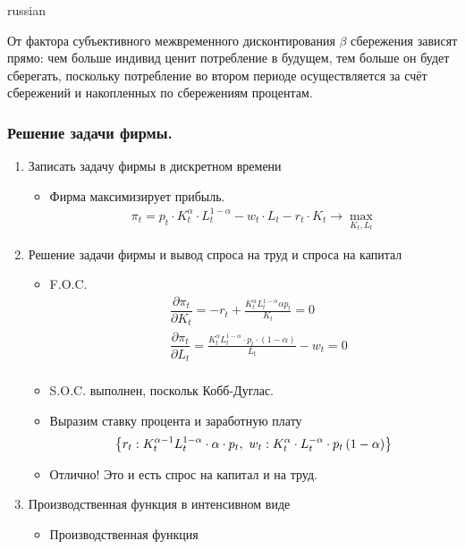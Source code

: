 \documentclass[fleqn]{article}
\begin{document}
\begin{otherlanguage*}{russian}
\begin{enumerate}[label=\alph*), leftmargin=*]
\begin{itemize}
От фактора субъективного межвременного дисконтирования $ \beta$ сбережения зависят прямо: чем больше индивид ценит потребление в будущем, тем больше он будет сберегать, поскольку потребление во втором периоде осуществляется за счёт сбережений и накопленных  по сбережениям процентам. 
\end{itemize}
\end{enumerate}
\subsubsection*{Решение задачи фирмы. }
\begin{enumerate}[label=\alph*), leftmargin=*]
\item Записать задачу фирмы в дискретном времени 
\begin{itemize}
\item Фирма максимизирует прибыль.
\begin{align*}
\pi_t = p_t \cdot  K^{\alpha}_t \cdot L_t ^ {1-\alpha}  - w_t \cdot L_t - r_t \cdot K_t \rightarrow \max_{K_t, L_t}
\end{align*}
\end{itemize}
\item Решение задачи фирмы и вывод спроса на труд и спроса на капитал 
\begin{itemize}
\item F.O.C.
\begin{align*}
&\dfrac{\partial \pi_t}{\partial K_t} =- r_{t} + \frac{K_{t}^{\alpha} L_{t}^{1 - \alpha} \alpha p_{t}}{K_{t}} = 0 
\\
&\dfrac{\partial \pi_t}{\partial L_t} = \frac{K_{t}^{\alpha} L_{t}^{1 - \alpha} \cdot  p_{t} \cdot \left( 1 - \alpha\right)}{L_{t}} - w_{t} = 0 
\\
\end{align*}
\item S.O.C. выполнен, поскольк Кобб-Дуглас. 
\item Выразим ставку процента и заработную плату 
$$ \left\{ r_{t} : K_{t}^{\alpha - 1} L_{t}^{1 - \alpha} \cdot \alpha \cdot p_{t}, \\ \  w_{t} : K_{t}^{\alpha} \cdot L_{t}^{- \alpha} \cdot p_{t} \left(1 - \alpha\right)\right\} $$

\item Отлично! Это и есть спрос на капитал и на труд.
\end{itemize}
\item Производственная функция в интенсивном виде 
\begin{itemize}
\item Производственная функция 


\end{itemize}
\end{enumerate}
\end{otherlanguage*}
\end{document}

